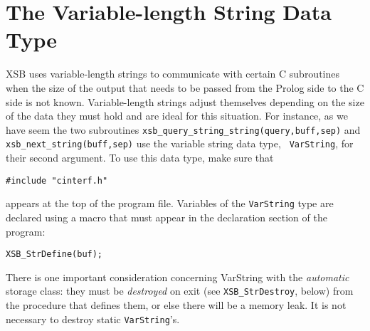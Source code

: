 \section{The Variable-length String Data Type}\label{sec-varstring}

 XSB uses variable-length strings to communicate with
certain C subroutines when the size of the output that needs to be passed
from the Prolog side to the C side is not known. Variable-length strings
adjust themselves depending on the size of the data they must hold and are
ideal for this situation. For instance, as we have seem the two subroutines
{\tt xsb\_query\_string\_string(query,buff,sep)} and {\tt
  xsb\_next\_string(buff,sep)} use the variable string data type, {\tt
  VarString}, for their second argument.  To use this data type, make sure
that
\begin{verbatim}
#include "cinterf.h"  
\end{verbatim}
appears at the top of the program file.  Variables of the {\tt VarString}
type are declared using a macro that must appear in the declaration section
of the program:
\begin{verbatim}
XSB_StrDefine(buf);  
\end{verbatim}
There is one important consideration concerning VarString with the
\emph{automatic} storage class: they must be
\emph{destroyed} on exit (see {\tt XSB\_StrDestroy}, below) from the procedure
that defines them, or else there will be a memory leak. 
It is not necessary to destroy static {\tt VarString}'s.


